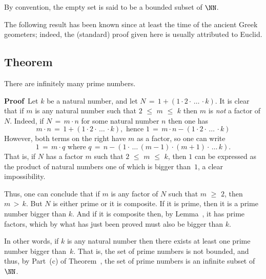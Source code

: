 {        By convention, the empty set is said to be a bounded subset of ${\NN}$.

\V
\V




        The following result has been known since at least the time of the ancient Greek geometers;
    indeed, the (standard) proof given here is usually attributed to Euclid.

\V

            \subsection{\small{\bf Theorem}}
            \label{ThmA20.25}

\V


        There are infinitely many prime numbers.

\V

        {\bf Proof}\,  Let $k$ be a natural number, and let $N \,=\, 1+(1{\cdot}2{\cdot}\,{\ldots}\,{\cdot}k)$.
    It is clear that if $m$ is any natural number such that $2\,\,{\leq}\,\,m\,\,{\leq}\,\,k$ then $m$ is {\em not} a factor of $N$.
    Indeed, if $N \,=\, m{\cdot}n$ for some natural number $n$ then one has
        \begin{displaymath}
        m{\cdot}n \,=\, 1+(1{\cdot}2{\cdot}\,{\ldots}\,{\cdot}k), \mbox{ hence }
    1 \,=\, m{\cdot}n - (1{\cdot}2{\cdot}\,{\ldots}\,{\cdot}k)
        \end{displaymath}
    However, both terms on the right have $m$ as a factor, so one can write
        \begin{displaymath}
        1 \,=\, m{\cdot}q \mbox{ where } q \,=\, n-(1{\cdot}\,{\ldots}\,(m-1){\cdot}(m+1){\cdot}\,{\ldots}\,k).
        \end{displaymath}
    That is, if $N$ has a factor $m$ such that $2\,\,{\leq}\,\,m\,\,{\leq}\,\,k$, then $1$ can be expressed as the product of natural numbers one of which is bigger than~$1$, a clear impossibility.

        Thus, one can conclude that if $m$ is any factor of $N$ such that $m\,\,{\geq}\,\,2$, then $m\,>\,k$.
    But $N$ is either prime or it is composite. If it is prime, then it is a prime number bigger than $k$.
    And if it is composite then, by Lemma~, it has prime factors, which by what has just been proved must also be bigger than $k$.

        In other words, if $k$ is any natural number then there exists at least one prime number bigger than~$k$.
    That is, the set of prime numbers is not bounded, and thus, by Part~(c) of Theorem~, the set of prime numbers is an infinite subset of ${\NN}$.


\VV

}%



